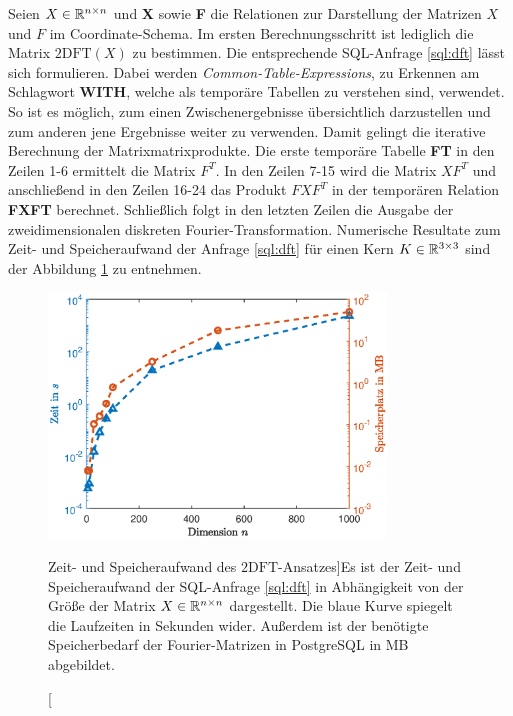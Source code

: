 Seien $X \in \mathbb{R}^{n \times n}$ und \textbf{X} sowie \textbf{F} die Relationen zur Darstellung der Matrizen $X$ und $F$ im Coordinate-Schema. Im ersten Berechnungsschritt ist lediglich die Matrix $\mathrm{2DFT}(X)$ zu bestimmen. Die entsprechende SQL-Anfrage \ref{sql:dft} lässt sich formulieren. Dabei werden \textit{Common-Table-Expressions}, zu Erkennen am Schlagwort \textbf{WITH}, welche als temporäre Tabellen zu verstehen sind, verwendet. So ist es möglich, zum einen Zwischenergebnisse übersichtlich darzustellen und zum anderen jene Ergebnisse weiter zu verwenden. Damit gelingt die iterative Berechnung der Matrixmatrixprodukte. Die erste temporäre Tabelle \textbf{FT}
in den Zeilen 1-6 ermittelt die Matrix $F^T$. In den Zeilen 7-15 wird die Matrix $X F^T$ und anschließend in den Zeilen 16-24 das Produkt $F X F^T$ in der temporären Relation \textbf{FXFT} berechnet. 
Schließlich folgt in den letzten Zeilen die Ausgabe der zweidimensionalen diskreten Fourier-Transformation. Numerische Resultate zum Zeit- und Speicheraufwand der Anfrage \ref{sql:dft} für einen Kern $K \in \mathbb{R}^{3 \times 3}$ sind der Abbildung \ref{abb:dft_insql} zu entnehmen.

\begin{figure}[h]
    \includegraphics[width=0.8\textwidth]{pics/chapters/kap5/data_plot_2dft_ver.eps}
    \centering
    \caption[Laufzeiten und Speicherbedarf bei der $\mathrm{2DFT}$][Zeit- und Speicheraufwand des $\mathrm{2DFT}$-Ansatzes]{Es ist der Zeit- und Speicheraufwand der SQL-Anfrage \ref{sql:dft} in Abhängigkeit von der Größe der Matrix $X \in \mathbb{R}^{n \times n}$ dargestellt. Die blaue Kurve spiegelt die Laufzeiten in Sekunden wider. Außerdem ist der benötigte Speicherbedarf der Fourier-Matrizen in PostgreSQL in MB abgebildet.}
    \label{abb:dft_insql}
\end{figure}

